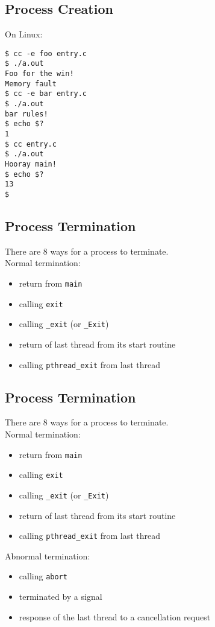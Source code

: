 \documentclass[xga]{xdvislides}
\begin{document}
\subsection{Process Creation}
On Linux:
\begin{verbatim}
$ cc -e foo entry.c
$ ./a.out
Foo for the win!
Memory fault
$ cc -e bar entry.c
$ ./a.out
bar rules!
$ echo $?
1
$ cc entry.c
$ ./a.out
Hooray main!
$ echo $?
13
$
\end{verbatim}

\subsection{Process Termination}
There are 8 ways for a process to terminate.
\\

Normal termination:
\begin{itemize}
	\item return from {\tt main}
	\item calling {\tt exit}
	\item calling {\tt \_exit} (or {\tt\_Exit})
	\item return of last thread from its start routine
	\item calling {\tt pthread\_exit} from last thread
\end{itemize}
\vspace{.25in}

\subsection{Process Termination}
There are 8 ways for a process to terminate.
\\

Normal termination:
\begin{itemize}
	\item return from {\tt main}
	\item calling {\tt exit}
	\item calling {\tt \_exit} (or {\tt\_Exit})
	\item return of last thread from its start routine
	\item calling {\tt pthread\_exit} from last thread
\end{itemize}
\vspace{.25in}
Abnormal termination:
\begin{itemize}
	\item calling {\tt abort}
	\item terminated by a signal
	\item response of the last thread to a cancellation request
\end{itemize}
\end{document}
